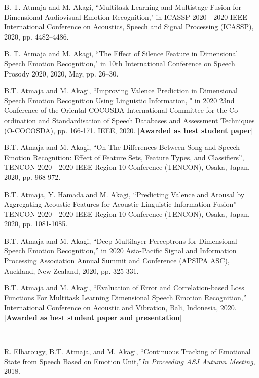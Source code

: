 \begin{publication}
\item
B. T. Atmaja and M. Akagi, ``Multitask Learning and Multistage Fusion for Dimensional Audiovisual Emotion Recognition," in ICASSP 2020 - 2020 IEEE International Conference on Acoustics, Speech and Signal Processing (ICASSP), 2020, pp. 4482--4486.

\item
B. T. Atmaja and M. Akagi, ``The Effect of Silence Feature in Dimensional
Speech Emotion Recognition," in 10th International Conference on Speech Prosody
2020, 2020, May, pp. 26--30.

\item
B.T. Atmaja and M. Akagi, ``Improving Valence Prediction in
Dimensional Speech Emotion Recognition Using Linguistic Information, " in 2020
23nd Conference of the Oriental COCOSDA International Committee for the
Co-ordination and Standardisation of Speech Databases and Assessment Techniques
(O-COCOSDA), pp. 166-171. IEEE, 2020. [\textbf{Awarded as best student paper}]

\item
B.T. Atmaja and M. Akagi, ``On The Differences Between Song and Speech Emotion
Recognition: Effect of Feature Sets, Feature Types, and Classifiers'', TENCON
2020 - 2020 IEEE Region 10 Conference (TENCON), Osaka, Japan, 2020, pp. 968-972.

\item
B.T. Atmaja, Y. Hamada  and M. Akagi, ``Predicting Valence and Arousal by Aggregating Acoustic Features for Acoustic-Linguistic Information Fusion''
TENCON 2020 - 2020 IEEE Region 10 Conference (TENCON), Osaka, Japan, 2020, pp. 1081-1085. 

\item 
B.T. Atmaja and M. Akagi, ``Deep Multilayer Perceptrons for Dimensional Speech
Emotion Recognition,'' in 2020 Asia-Pacific Signal and Information Processing
Association Annual Summit and Conference (APSIPA ASC), Auckland, New Zealand,
2020, pp. 325-331.

\item 
B.T. Atmaja and M. Akagi, ``Evaluation of Error and Correlation-based Loss
Functions For Multitask Learning Dimensional Speech Emotion Recognition,''
International Conference on Acoustic and Vibration, Bali, Indonesia, 2020.
[\textbf{Awarded as best student paper and presentation}]\\

\item[] \hspace{-1cm}{\LARGE\bf Domestic Conferences} \\ 
\item 
R. Elbarougy, B.T. Atmaja, and M. Akagi, ``Continuous Tracking of Emotional
State from Speech Based on Emotion Unit,''\textit{In Proceeding ASJ Autumn
Meeting}, 2018.


\end{publication}
